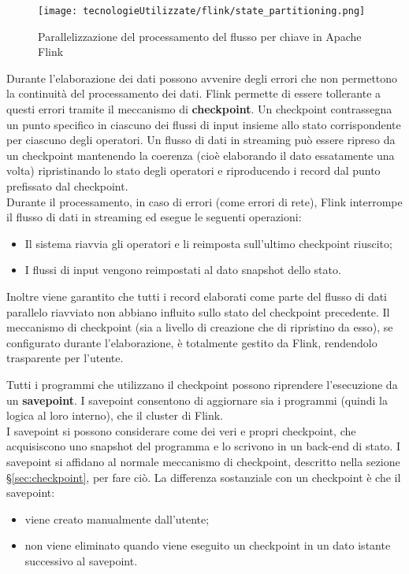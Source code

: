\begin{figure}[!h] 
    \centering 
    \texttt{[image: tecnologieUtilizzate/flink/state\_partitioning.png]} 
    \caption{Parallelizzazione del processamento del flusso per chiave in Apache Flink}
\end{figure}

\label{sec:checkpoint}
Durante l'elaborazione dei dati possono avvenire degli errori che non permettono la continuità del processamento dei dati. Flink permette di essere tollerante a questi errori tramite il meccanismo di \textbf{checkpoint}. Un checkpoint contrassegna un punto specifico in ciascuno dei flussi di input insieme allo stato corrispondente per ciascuno degli operatori. Un flusso di dati in streaming può essere ripreso da un checkpoint mantenendo la coerenza (cioè elaborando il dato essatamente una volta) ripristinando lo stato degli operatori e riproducendo i record dal punto prefissato dal checkpoint.\\
Durante il processamento, in caso di errori (come errori di rete), Flink interrompe il flusso di dati in streaming ed esegue le seguenti operazioni:
\begin{itemize}
	\item{Il sistema riavvia gli operatori e li reimposta sull'ultimo checkpoint riuscito;}
	\item{I flussi di input vengono reimpostati al dato \gls{snapshot} dello stato.}
\end{itemize}
Inoltre viene garantito che tutti i record elaborati come parte del flusso di dati parallelo riavviato non abbiano influito sullo stato del checkpoint precedente.
Il meccanismo di checkpoint (sia a livello di creazione che di ripristino da esso), se configurato durante l'elaborazione, è totalmente gestito da Flink, rendendolo trasparente per l'utente.

Tutti i programmi che utilizzano il checkpoint possono riprendere l'esecuzione da un \textbf{savepoint}. I savepoint  consentono di aggiornare sia i programmi (quindi la logica al loro interno), che il \gls{cluster} di Flink.\\
I savepoint si possono considerare come dei veri e propri checkpoint, che acquisiscono uno \gls{snapshot} del programma e lo scrivono in un back-end di stato. I savepoint si affidano al normale meccanismo di checkpoint, descritto nella sezione \S\ref{sec:checkpoint}, per fare ciò. La differenza sostanziale con un checkpoint è che il savepoint:
\begin{itemize}
	\item{viene creato manualmente dall'utente;}
	\item{non viene eliminato quando viene eseguito un checkpoint in un dato istante successivo al savepoint.}
\end{itemize}


